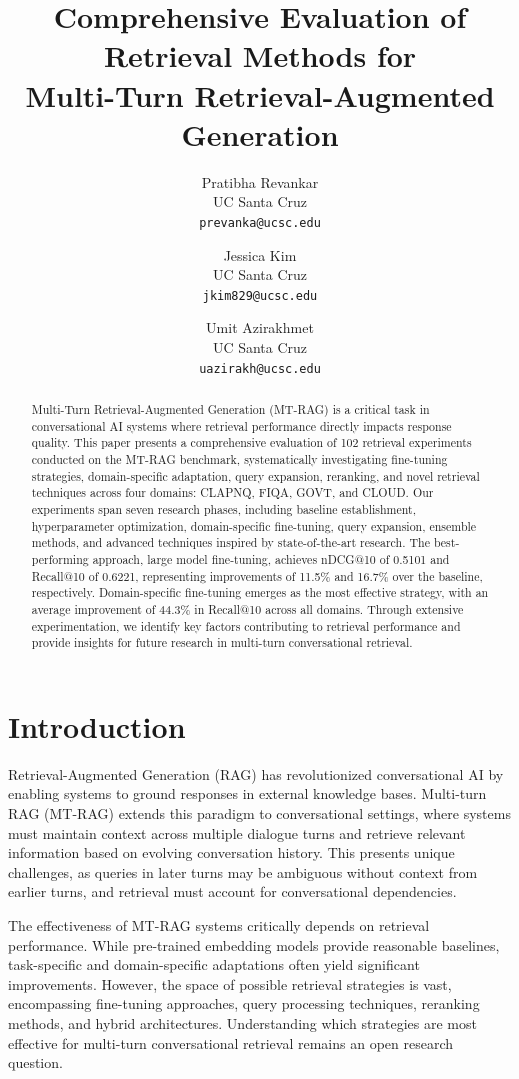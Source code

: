 \documentclass[11pt]{article}
\title{Comprehensive Evaluation of Retrieval Methods for\\Multi-Turn Retrieval-Augmented Generation}
\author{%
  Pratibha Revankar \\
  UC Santa Cruz \\
  \texttt{prevanka@ucsc.edu} \\
  \and
  Jessica Kim \\
  UC Santa Cruz \\
  \texttt{jkim829@ucsc.edu} \\
  \and
  Umit Azirakhmet \\
  UC Santa Cruz \\
  \texttt{uazirakh@ucsc.edu} \\
}
\begin{document}
\maketitle

\begin{abstract}
Multi-Turn Retrieval-Augmented Generation (MT-RAG) is a critical task in conversational AI systems where retrieval performance directly impacts response quality. This paper presents a comprehensive evaluation of 102 retrieval experiments conducted on the MT-RAG benchmark, systematically investigating fine-tuning strategies, domain-specific adaptation, query expansion, reranking, and novel retrieval techniques across four domains: CLAPNQ, FIQA, GOVT, and CLOUD. Our experiments span seven research phases, including baseline establishment, hyperparameter optimization, domain-specific fine-tuning, query expansion, ensemble methods, and advanced techniques inspired by state-of-the-art research. The best-performing approach, large model fine-tuning, achieves nDCG@10 of 0.5101 and Recall@10 of 0.6221, representing improvements of 11.5\% and 16.7\% over the baseline, respectively. Domain-specific fine-tuning emerges as the most effective strategy, with an average improvement of 44.3\% in Recall@10 across all domains. Through extensive experimentation, we identify key factors contributing to retrieval performance and provide insights for future research in multi-turn conversational retrieval.
\end{abstract}

\section{Introduction}

Retrieval-Augmented Generation (RAG) has revolutionized conversational AI by enabling systems to ground responses in external knowledge bases. Multi-turn RAG (MT-RAG) extends this paradigm to conversational settings, where systems must maintain context across multiple dialogue turns and retrieve relevant information based on evolving conversation history. This presents unique challenges, as queries in later turns may be ambiguous without context from earlier turns, and retrieval must account for conversational dependencies.

The effectiveness of MT-RAG systems critically depends on retrieval performance. While pre-trained embedding models provide reasonable baselines, task-specific and domain-specific adaptations often yield significant improvements. However, the space of possible retrieval strategies is vast, encompassing fine-tuning approaches, query processing techniques, reranking methods, and hybrid architectures. Understanding which strategies are most effective for multi-turn conversational retrieval remains an open research question.
\end{document}

